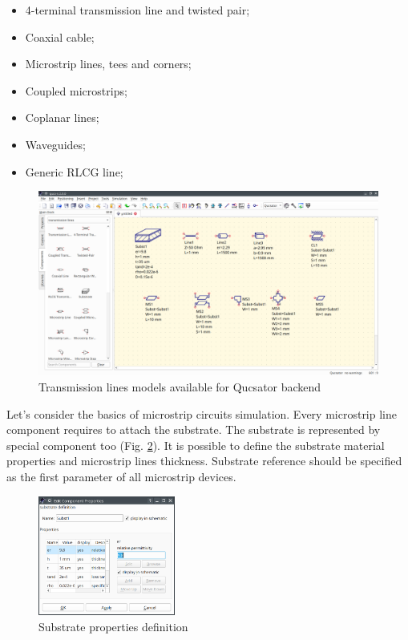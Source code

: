 \documentclass[a4paper,12pt]{article}
\begin{document}
\begin{itemize}
 \item 4-terminal transmission line and twisted pair;
 \item Coaxial cable;
 \item Microstrip lines, tees and corners;
 \item Coupled microstrips;
 \item Coplanar lines;
 \item Waveguides;
 \item Generic RLCG line;
\end{itemize}

    \begin{figure}[!ht]
    \begin{center}
        \includegraphics[width=\textwidth]{img/tlines.png}
    \end{center}
    \caption{Transmission lines models available for Qucsator backend} \label{fig:tlines}
    \end{figure}
    
Let's consider the basics of microstrip circuits simulation. Every microstrip line component requires to attach the substrate. The substrate is represented by special component too (Fig. \ref{fig:subst}). It is possible to define the substrate material properties and microstrip lines thickness. Substrate reference should be specified as the first parameter of all microstrip devices.

    \begin{figure}[!ht]
    \begin{center}
        \includegraphics[width=0.4\textwidth]{img/substr.png}
    \end{center}
    \caption{Substrate properties definition} \label{fig:subst}
    \end{figure}
    
\end{document}

